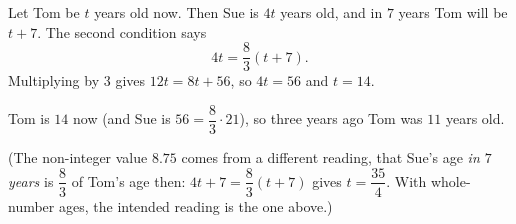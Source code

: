 Let Tom be $t$ years old now. Then Sue is $4t$ years old, and in $7$ years Tom will be $t+7$. The second condition says
\[4t=\dfrac83(t+7).\]
Multiplying by $3$ gives $12t=8t+56$, so $4t=56$ and $t=14$.

Tom is $14$ now (and Sue is $56=\dfrac83\cdot21$), so three years ago Tom was $\boxed{11}$ years old.

(The non-integer value $8.75$ comes from a different reading, that Sue's age \emph{in $7$ years} is $\dfrac83$ of Tom's age then: $4t+7=\dfrac83(t+7)$ gives $t=\dfrac{35}{4}$. With whole-number ages, the intended reading is the one above.)
